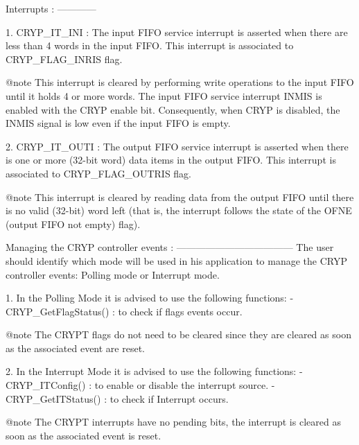 \begin{DoxyVerb}
  Interrupts :
  ------------

   1. CRYP_IT_INI   : The input FIFO service interrupt is asserted when there 
                      are less than 4 words in the input FIFO.
                      This interrupt is associated to CRYP_FLAG_INRIS flag.

                @note This interrupt is cleared by performing write operations 
                      to the input FIFO until it holds 4 or more words. The 
                      input FIFO service interrupt INMIS is enabled with the 
                      CRYP enable bit. Consequently, when CRYP is disabled, the 
                      INMIS signal is low even if the input FIFO is empty.



   2. CRYP_IT_OUTI  : The output FIFO service interrupt is asserted when there 
                      is one or more (32-bit word) data items in the output FIFO.
                      This interrupt is associated to CRYP_FLAG_OUTRIS flag.

                @note This interrupt is cleared by reading data from the output 
                      FIFO until there is no valid (32-bit) word left (that is, 
                      the interrupt follows the state of the OFNE (output FIFO 
                      not empty) flag).


  Managing the CRYP controller events :
  ------------------------------------ 
  The user should identify which mode will be used in his application to manage 
  the CRYP controller events: Polling mode or Interrupt mode.

  1.  In the Polling Mode it is advised to use the following functions:
      - CRYP_GetFlagStatus() : to check if flags events occur. 

  @note  The CRYPT flags do not need to be cleared since they are cleared as 
         soon as the associated event are reset.   


  2.  In the Interrupt Mode it is advised to use the following functions:
      - CRYP_ITConfig()       : to enable or disable the interrupt source.
      - CRYP_GetITStatus()    : to check if Interrupt occurs.

  @note  The CRYPT interrupts have no pending bits, the interrupt is cleared as 
         soon as the associated event is reset. \end{DoxyVerb}
 

